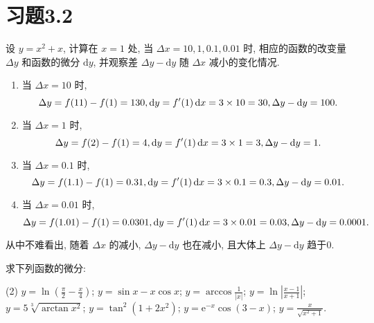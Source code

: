 \section{习题3.2}

\begin{exercise}[3.2.1]
    设 $y=x^2+x$, 计算在 $x=1$ 处, 当 $\Delta x = 10, 1, 0.1, 0.01$ 时, 相应的函数的改变量 $\Delta y$ 和函数的微分 $\mathrm{d}y$, 并观察差 $\Delta y - \mathrm{d}y$ 随 $\Delta x$ 减小的变化情况.
\end{exercise}

\begin{solution}
    \begin{enumerate}
        \item 当 $\Delta x = 10$ 时, $$\Delta y = f(11) - f(1) = 130, \operatorname{d\!} y = f'(1) \operatorname{d\!} x = 3 \times 10 = 30, \Delta y - \operatorname{d\!} y = 100.$$
        \item 当 $\Delta x = 1$ 时, $$\Delta y = f(2) - f(1) = 4, \operatorname{d\!} y = f'(1) \operatorname{d\!} x = 3 \times 1 = 3, \Delta y - \operatorname{d\!} y = 1.$$
        \item 当 $\Delta x = 0.1$ 时, $$\Delta y = f(1.1) - f(1) = 0.31, \operatorname{d\!} y = f'(1) \operatorname{d\!} x = 3 \times 0.1 = 0.3, \Delta y - \operatorname{d\!} y = 0.01.$$
        \item 当 $\Delta x = 0.01$ 时, $$\Delta y = f(1.01) - f(1) = 0.0301, \operatorname{d\!} y = f'(1) \operatorname{d\!} x = 3 \times 0.01 = 0.03, \Delta y - \operatorname{d\!} y = 0.0001.$$
    \end{enumerate}
    从中不难看出, 随着 $\Delta x$ 的减小, $\Delta y - \mathrm{d}y$ 也在减小, 且大体上 $\Delta y - \mathrm{d}y $ 趋于$0$.
\end{solution}

\begin{exercise}[3.2.2]
    求下列函数的微分:
    \begin{tasks}[label=(\arabic*)](2)
        \task $y=\ln(\frac{\pi}{2}-\frac{x}{4})$;
        \task $y = \sin x - x\cos x$;
        \task $y=\arccos\frac{1}{|x|}$;
        \task $y=\ln\left|\frac{x-1}{x+1}\right|$;
        \task $y=5\sqrt[3]{\arctan x^2}$;
        \task $y=\tan^2(1+2x^2)$;
        \task $y=\mathrm{e}^{-x}\cos(3-x)$;
        \task $y=\frac{x}{\sqrt{x^2+1}}$.
    \end{tasks}
\end{exercise}

